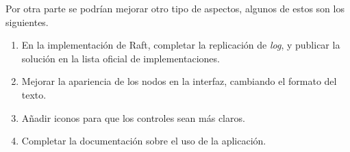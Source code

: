 Por otra parte se podrían mejorar otro tipo de aspectos, algunos de estos son los siguientes.

\begin{enumerate}
\item En la implementación de Raft, completar la replicación de \textit{log}, y publicar la solución en la lista oficial de implementaciones\cite{raft1}.

\item Mejorar la apariencia de los nodos en la interfaz, cambiando el formato del texto.

\item Añadir iconos para que los controles sean más claros.

\item Completar la documentación sobre el uso de la aplicación.
\end{enumerate}
